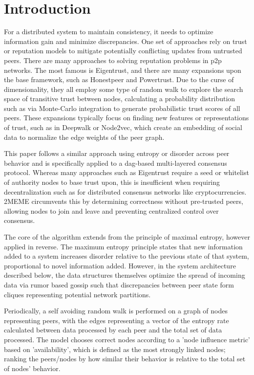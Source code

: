 \documentclass{article}
\begin{document}
\section{Introduction}
For a distributed system to maintain consistency, it needs to optimize information gain and minimize discrepancies. One set of approaches rely on trust or reputation models to mitigate potentially conflicting updates from untrusted peers. There are many approaches to solving reputation problems in p2p networks. The most famous is Eigentrust, and there are many expansions upon the base framework, such as Honestpeer and Powertrust. Due to the curse of dimensionality, they all employ some type of random walk to explore the search space of transitive trust between nodes, calculating a probability distribution such as via Monte-Carlo integration to generate probabilistic trust scores of all peers. These expansions typically focus on finding new features or representations of trust, such as in Deepwalk or Node2vec, which create an embedding of social data to normalize the edge weights of the peer graph.

This paper follows a similar approach using entropy or disorder across peer behavior and is specifically applied to a dag-based multi-layered consensus protocol. Whereas many approaches such as Eigentrust require a seed or whitelist of authority nodes to base trust upon, this is insufficient when requiring decentralization such as for distributed consensus networks like cryptocurrencies. 2MEME circumvents this by determining correctness without pre-trusted peers, allowing nodes to join and leave and preventing centralized control over consensus.

The core of the algorithm extends from the principle of maximal entropy, however applied in reverse. The maximum entropy principle states that new information added to a system increases disorder relative to the previous state of that system, proportional to novel information added. However, in the system architecture described below, the data structures themselves optimize the spread of incoming data via rumor based gossip such that discrepancies between peer state form cliques representing potential network partitions.

Periodically, a self avoiding random walk is performed on a graph of nodes representing peers, with the edges representing a vector of the entropy rate calculated between data processed by each peer and the total set of data processed. The model chooses correct nodes according to a 'node influence metric' based on 'availability', which is defined as the most strongly linked nodes; ranking the peers/nodes by how similar their behavior is relative to the total set of nodes' behavior.
\end{document}

